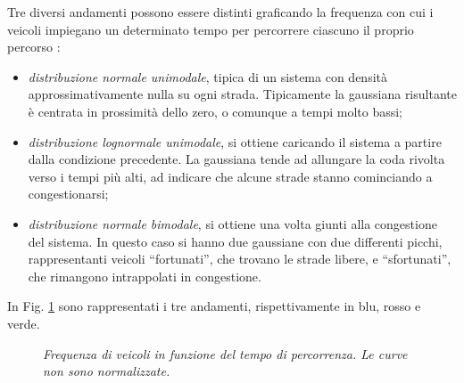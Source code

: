 \documentclass[../main.tex]{subfiles}
\begin{document}
Tre diversi andamenti possono essere distinti graficando la frequenza con cui i veicoli impiegano un determinato tempo per percorrere ciascuno il proprio percorso \cite{TravelTime}:
\begin{itemize}
    \item \emph{distribuzione normale unimodale}, tipica di un sistema con densit\`a approssimativamente nulla su ogni strada.
        Tipicamente la gaussiana risultante \`e centrata in prossimit\`a dello zero, o comunque a tempi molto bassi;
    \item \emph{distribuzione lognormale unimodale}, si ottiene caricando il sistema a partire dalla condizione precedente.
        La gaussiana tende ad allungare la coda rivolta verso i tempi pi\`u alti, ad indicare che alcune strade stanno cominciando a congestionarsi;
    \item \emph{distribuzione normale bimodale}, si ottiene una volta giunti alla congestione del sistema.
        In questo caso si hanno due gaussiane con due differenti picchi, rappresentanti veicoli ``fortunati'', che trovano le strade libere, e ``sfortunati'', che rimangono intrappolati in congestione.
\end{itemize}
In Fig. \ref{fig:frequency_distributions} sono rappresentati i tre andamenti, rispettivamente in blu, rosso e verde.
\begin{figure}[H]
    \centering
    \caption[Frequenza di veicoli in funzione del tempo di percorrenza]{\emph{Frequenza di veicoli in funzione del tempo di percorrenza. Le curve non sono normalizzate.}}
    \label{fig:frequency_distributions}
\end{figure}
\end{document}
